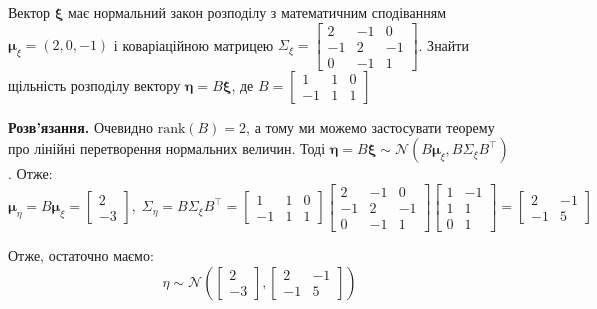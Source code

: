 \documentclass{hw_template}
\begin{document}
\begin{problem}
    Вектор $\boldsymbol{\xi}$ має нормальний закон розподілу з математичним сподіванням $\boldsymbol{\mu}_{\xi}=(2,0,-1)$ і коваріаційною матрицею $\Sigma_{\xi} = \begin{bmatrix}
        2 & -1 & 0 \\ -1 & 2 & -1 \\ 0 & -1 & 1
    \end{bmatrix}$. Знайти щільність розподілу вектору $\boldsymbol{\eta} = B\boldsymbol{\xi}$, де $B = \begin{bmatrix}
        1 & 1 & 0 \\ -1 & 1 & 1
    \end{bmatrix}$
\end{problem}

\textbf{Розв'язання.} Очевидно $\text{rank}(B) = 2$, а тому ми можемо застосувати теорему про лінійні перетворення нормальних величин. Тоді $\boldsymbol{\eta} = B\boldsymbol{\xi} \sim \mathcal{N}(B\boldsymbol{\mu}_{\xi}, B\Sigma_{\xi}B^{\top})$. Отже:
\begin{equation*}
    \boldsymbol{\mu}_{\eta} = B\boldsymbol{\mu}_{\xi} = \begin{bmatrix}
        2 \\ -3
    \end{bmatrix}, \; \Sigma_{\eta} = B\Sigma_{\xi}B^{\top} = \begin{bmatrix}
        1 & 1 & 0 \\ -1 & 1 & 1
    \end{bmatrix} \begin{bmatrix}
        2 & -1 & 0 \\ -1 & 2 & -1 \\ 0 & -1 & 1
    \end{bmatrix} \begin{bmatrix}
        1 & -1 \\ 1 & 1 \\ 0 & 1
    \end{bmatrix} = \begin{bmatrix}
        2 & -1 \\ -1 & 5
    \end{bmatrix}
\end{equation*}

Отже, остаточно маємо:
\begin{equation*}
    \eta \sim \mathcal{N}\left(\begin{bmatrix}
        2 \\ -3
    \end{bmatrix}, \begin{bmatrix}
        2 & -1 \\ -1 & 5
    \end{bmatrix}\right)
\end{equation*}
\end{document}
